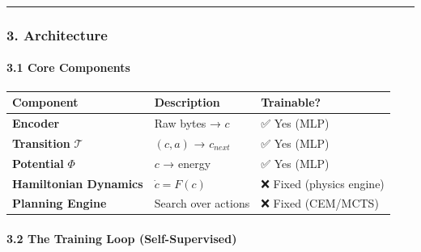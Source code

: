 \documentclass[
  11pt,
  a4paper,
]{article}
\begin{document}
\begin{center}\rule{0.5\linewidth}{0.5pt}\end{center}

\subsubsection{3. Architecture}\label{architecture}

\paragraph{3.1 Core Components}\label{core-components}

\begin{longtable}[]{@{}
  >{\raggedright\arraybackslash}p{}
  >{\raggedright\arraybackslash}p{}
  >{\raggedright\arraybackslash}p{}@{}}
\toprule\noalign{}
\begin{minipage}[b]{\linewidth}\raggedright
Component
\end{minipage} & \begin{minipage}[b]{\linewidth}\raggedright
Description
\end{minipage} & \begin{minipage}[b]{\linewidth}\raggedright
Trainable?
\end{minipage} \\
\midrule\noalign{}
\endhead
\bottomrule\noalign{}
\endlastfoot
\textbf{Encoder} & Raw bytes → \(c\) & ✅ Yes (MLP) \\
\textbf{Transition} \(\mathcal{T}\) & \((c, a)\) → \(c_{next}\) & ✅ Yes
(MLP) \\
\textbf{Potential} \(\Phi\) & \(c\) → energy & ✅ Yes (MLP) \\
\textbf{Hamiltonian Dynamics} & \(\dot{c} = F(c)\) & ❌ Fixed (physics
engine) \\
\textbf{Planning Engine} & Search over actions & ❌ Fixed (CEM/MCTS) \\
\end{longtable}

\paragraph{3.2 The Training Loop
(Self-Supervised)}\label{the-training-loop-self-supervised}
\end{document}
